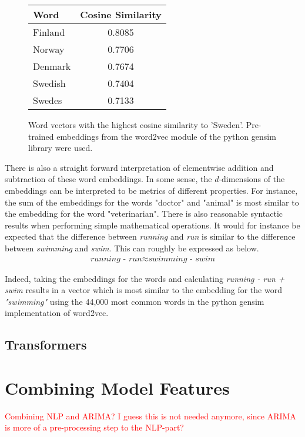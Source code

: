 \begin{figure}[h!]
    \centering
    \begin{tabular}{l|c|}
        Word & Cosine Similarity  \\
        \hline \hline 
        Finland & 0.8085 \\
        Norway  & 0.7706 \\
        Denmark & 0.7674 \\
        Swedish & 0.7404 \\
        Swedes  & 0.7133 \\
        \hline 
    \end{tabular}
    \caption{Word vectors with the highest cosine similarity to 'Sweden'. Pre-trained embeddings from the word2vec module of the python gensim library were used. }
\end{figure}

There is also a straight forward interpretation of elementwise addition and subtraction of these word embeddings. In some sense, the $d$-dimensions of the embeddings can be interpreted to be metrics of different properties. For instance, the sum of the embeddings for the words "doctor" and "animal" is most similar to the embedding for the word "veterinarian". There is also reasonable syntactic results when performing simple mathematical operations. It would for instance be expected that the difference between \textit{running} and \textit{run} is similar to the difference between \textit{swimming} and \textit{swim}. This can roughly be expressed as below. 
\begin{align}
    \textit{running - run} \approx  \textit{swimming - swim}
\end{align}

Indeed, taking the embeddings for the words and calculating \textit{running - run + swim} results in a vector which is most similar to the embedding for the word \textit{"swimming"} using the 44,000 most common words in the python gensim implementation of word2vec.


\subsection{Transformers}


\section{Combining Model Features}
\textcolor{red}{Combining NLP and ARIMA? I guess this is not needed anymore, since ARIMA is more of a pre-processing step to the NLP-part? }



